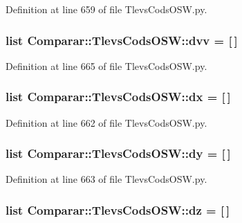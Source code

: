 \-Definition at line 659 of file \-Tlevs\-Cods\-O\-S\-W.\-py.

\subsubsection[{dvv}]{\setlength{\rightskip}{0pt plus 5cm}list {\bf \-Comparar\-::\-Tlevs\-Cods\-O\-S\-W\-::dvv} = [$\,$]}\label{namespace_comparar_1_1_tlevs_cods_o_s_w_ac1f107b08569a2892bf4f25463982276}


\-Definition at line 665 of file \-Tlevs\-Cods\-O\-S\-W.\-py.

\subsubsection[{dx}]{\setlength{\rightskip}{0pt plus 5cm}list {\bf \-Comparar\-::\-Tlevs\-Cods\-O\-S\-W\-::dx} = [$\,$]}\label{namespace_comparar_1_1_tlevs_cods_o_s_w_ac674ac6e1d533a5fda250de97499ddc1}


\-Definition at line 662 of file \-Tlevs\-Cods\-O\-S\-W.\-py.

\subsubsection[{dy}]{\setlength{\rightskip}{0pt plus 5cm}list {\bf \-Comparar\-::\-Tlevs\-Cods\-O\-S\-W\-::dy} = [$\,$]}\label{namespace_comparar_1_1_tlevs_cods_o_s_w_ae3eb3943f7c7f1ff35d72ccc15e9fef4}


\-Definition at line 663 of file \-Tlevs\-Cods\-O\-S\-W.\-py.

\subsubsection[{dz}]{\setlength{\rightskip}{0pt plus 5cm}list {\bf \-Comparar\-::\-Tlevs\-Cods\-O\-S\-W\-::dz} = [$\,$]}\label{namespace_comparar_1_1_tlevs_cods_o_s_w_a082b1f8c817120b5d9d9ae363ea10729}


